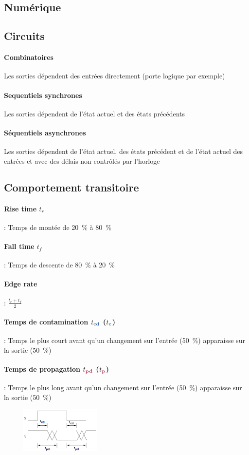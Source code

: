 \documentclass[resume]{subfiles}
\begin{document}
\begin{multicols}{3}
\section{Numérique}
\subsection{Circuits}
\paragraph{Combinatoires} Les sorties dépendent des entrées directement (porte logique par exemple)
\paragraph{Sequentiels synchrones} Les sorties dépendent de l'état actuel et des états précédents
\paragraph{Séquentiels asynchrones} Les sorties dépendent de l'état actuel, des états précédent et de l'état actuel des entrées et avec des délais non-contrôlés par l'horloge
\subsection{Comportement transitoire}
\paragraph{Rise time $t_r$} : Temps de montée de \SI{20}{\percent} à \SI{80}{\percent}
\paragraph{Fall time $t_f$} : Temps de descente de \SI{80}{\percent} à \SI{20}{\percent}
\paragraph{Edge rate} : $\frac{t_r+t_f}{2}$
\paragraph{Temps de contamination $t_{\cdelay}$ ($t_{\cdel}$)} : Temps le plus court avant qu'un changement sur l'entrée (\SI{50}{\percent}) apparaisse sur la sortie (\SI{50}{\percent})
\paragraph{Temps de propagation $t_{\pdelay}$  ($t_{\pdel}$)} : Temps le plus long avant qu'un changement sur l'entrée (\SI{50}{\percent}) apparaisse sur la sortie (\SI{50}{\percent})
\begin{figure}[H]
\centering
\includegraphics[width=4cm]{img_31.png}
\end{figure}

\end{multicols}
\end{document}
